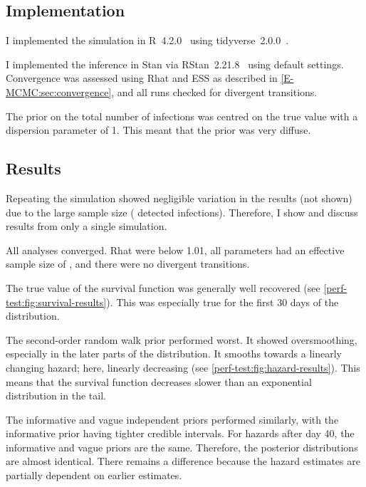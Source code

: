 \documentclass[thesis.tex]{subfiles}
\begin{document}
\subsection{Implementation}

I implemented the simulation in R~4.2.0~\autocite{R-4-2-0} using tidyverse~2.0.0~\autocite{tidyverse}.

I implemented the inference in Stan via RStan~2.21.8~\autocite{rstan2-21-8} using default settings.
Convergence was assessed using Rhat and ESS as described in \cref{E-MCMC:sec:convergence}, and all runs checked for divergent transitions.

The prior on the total number of infections was centred on the true value with a dispersion parameter of 1.
This meant that the prior was very diffuse.


\subsection{Results} \label{perf-test:sec:results}

Repeating the simulation showed negligible variation in the results (not shown) due to the large sample size ( detected infections).
Therefore, I show and discuss results from only a single simulation.

All analyses converged.
Rhat were below 1.01, all parameters had an effective sample size of , and there were no divergent transitions.

The true value of the survival function was generally well recovered (see \cref{perf-test:fig:survival-results}).
This was especially true for the first 30 days of the distribution.

The second-order random walk prior performed worst.
It showed oversmoothing, especially in the later parts of the distribution.
It smooths towards a linearly changing hazard; here, linearly decreasing (see \cref{perf-test:fig:hazard-results}).
This means that the survival function decreases slower than an exponential distribution in the tail.

The informative and vague independent priors performed similarly, with the informative prior having tighter credible intervals.
For hazards after day 40, the informative and vague priors are the same.
Therefore, the posterior distributions are almost identical.
There remains a difference because the hazard estimates are partially dependent on earlier estimates.
\end{document}
